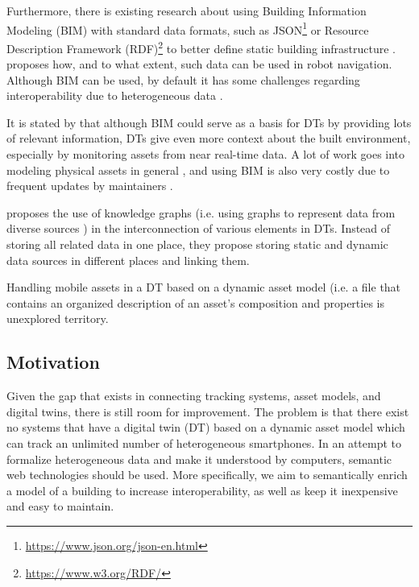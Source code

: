 \documentclass{article}
\begin{document}
Furthermore, there is existing research about using Building Information Modeling (BIM) with standard data formats, such as JSON\footnote{\url{https://www.json.org/json-en.html}} or Resource Description Framework (RDF)\footnote{\url{https://www.w3.org/RDF/}} to better define static building infrastructure \cite{pauwels_live_2023}. \citeauthor{pauwels_live_2023} proposes how, and to what extent, such data can be used in robot navigation. Although BIM can be used, by default it has some challenges regarding interoperability due to heterogeneous data \cite{dinis_bim_2022,godager_concept_2021}. 

It is stated by \citeauthor{godager_concept_2021} that although BIM could serve as a basis for DTs by providing lots of relevant information, DTs give even more context about the built environment, especially by monitoring assets from near real-time data. A lot of work goes into modeling physical assets in general \cite{waszak_let_2022}, and using BIM is also very costly due to frequent updates by maintainers \cite{hamledari_ifc-based_2018}.

\citeauthor{waszak_let_2022} proposes the use of knowledge graphs (i.e. using graphs to represent data from diverse sources \cite{hogan_introduction_2022, ryen_building_2022}) in the interconnection of various elements in DTs. Instead of storing all related data in one place, they propose storing static and dynamic data sources in different places and linking them.

Handling mobile assets in a DT based on a dynamic asset model (i.e. a file that contains an organized description of an asset's composition and properties \cite{kamburjan_twinning-by-construction_2022} is unexplored territory.


\subsection{Motivation}
Given the gap that exists in connecting tracking systems, asset models, and digital twins, there is still room for improvement. The problem is that there exist no systems that have a digital twin (DT) based on a dynamic asset model which can track an unlimited number of heterogeneous smartphones. In an attempt to formalize heterogeneous data and make it understood by computers, semantic web technologies should be used. More specifically, we aim to semantically enrich a model of a building to increase interoperability, as well as keep it inexpensive and easy to maintain.
\end{document}
